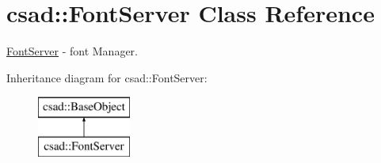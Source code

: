 \hypertarget{classcsad_1_1_font_server}{\section{csad\-:\-:Font\-Server Class Reference}
\label{classcsad_1_1_font_server}
}


\hyperlink{classcsad_1_1_font_server}{Font\-Server} -\/ font Manager.  


Inheritance diagram for csad\-:\-:Font\-Server\-:\begin{figure}[H]
\begin{center}
\leavevmode
\includegraphics[height=2.000000cm]{classcsad_1_1_font_server}
\end{center}
\end{figure}
